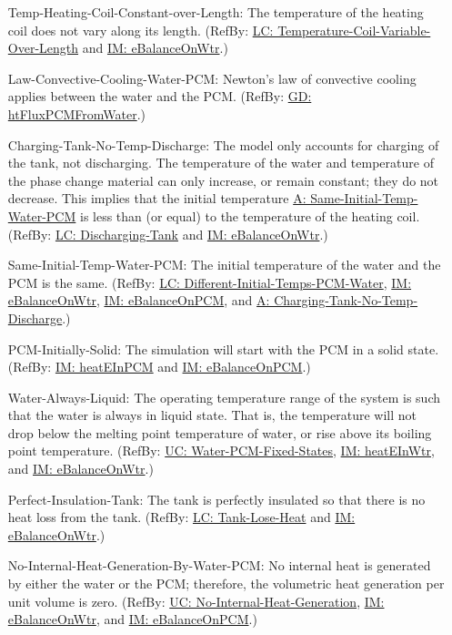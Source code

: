 \documentclass[12pt]{article}
\begin{document}
\begin{itemize}
\item[Temp-Heating-Coil-Constant-over-Length:\phantomsection\label{assumpTHCCoL}]{The temperature of the heating coil does not vary along its length. (RefBy: \hyperref[likeChgTCVOL]{LC: Temperature-Coil-Variable-Over-Length} and \hyperref[IM:eBalanceOnWtr]{IM: eBalanceOnWtr}.)}
\item[Law-Convective-Cooling-Water-PCM:\phantomsection\label{assumpLCCWP}]{Newton's law of convective cooling applies between the water and the PCM. (RefBy: \hyperref[GD:htFluxPCMFromWater]{GD: htFluxPCMFromWater}.)}
\item[Charging-Tank-No-Temp-Discharge:\phantomsection\label{assumpCTNOD}]{The model only accounts for charging of the tank, not discharging. The temperature of the water and temperature of the phase change material can only increase, or remain constant; they do not decrease. This implies that the initial temperature \hyperref[assumpSITWP]{A: Same-Initial-Temp-Water-PCM} is less than (or equal) to the temperature of the heating coil. (RefBy: \hyperref[likeChgDT]{LC: Discharging-Tank} and \hyperref[IM:eBalanceOnWtr]{IM: eBalanceOnWtr}.)}
\item[Same-Initial-Temp-Water-PCM:\phantomsection\label{assumpSITWP}]{The initial temperature of the water and the PCM is the same. (RefBy: \hyperref[likeChgDITPW]{LC: Different-Initial-Temps-PCM-Water}, \hyperref[IM:eBalanceOnWtr]{IM: eBalanceOnWtr}, \hyperref[IM:eBalanceOnPCM]{IM: eBalanceOnPCM}, and \hyperref[assumpCTNOD]{A: Charging-Tank-No-Temp-Discharge}.)}
\item[PCM-Initially-Solid:\phantomsection\label{assumpPIS}]{The simulation will start with the PCM in a solid state. (RefBy: \hyperref[IM:heatEInPCM]{IM: heatEInPCM} and \hyperref[IM:eBalanceOnPCM]{IM: eBalanceOnPCM}.)}
\item[Water-Always-Liquid:\phantomsection\label{assumpWAL}]{The operating temperature range of the system is such that the water is always in liquid state. That is, the temperature will not drop below the melting point temperature of water, or rise above its boiling point temperature. (RefBy: \hyperref[unlikeChgWPFS]{UC: Water-PCM-Fixed-States}, \hyperref[IM:heatEInWtr]{IM: heatEInWtr}, and \hyperref[IM:eBalanceOnWtr]{IM: eBalanceOnWtr}.)}
\item[Perfect-Insulation-Tank:\phantomsection\label{assumpPIT}]{The tank is perfectly insulated so that there is no heat loss from the tank. (RefBy: \hyperref[likeChgTLH]{LC: Tank-Lose-Heat} and \hyperref[IM:eBalanceOnWtr]{IM: eBalanceOnWtr}.)}
\item[No-Internal-Heat-Generation-By-Water-PCM:\phantomsection\label{assumpNIHGBWP}]{No internal heat is generated by either the water or the PCM; therefore, the volumetric heat generation per unit volume is zero. (RefBy: \hyperref[unlikeChgNIHG]{UC: No-Internal-Heat-Generation}, \hyperref[IM:eBalanceOnWtr]{IM: eBalanceOnWtr}, and \hyperref[IM:eBalanceOnPCM]{IM: eBalanceOnPCM}.)}

\end{itemize}
\end{document}
